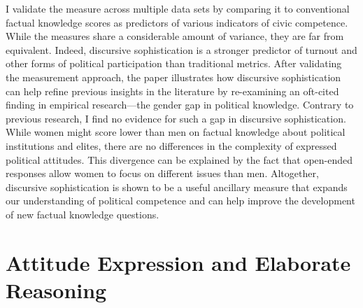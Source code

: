 I validate the measure across multiple data sets by comparing it to conventional factual knowledge scores as predictors of various indicators of civic competence. While the measures share a considerable amount of variance, they are far from equivalent. Indeed, discursive sophistication is a stronger predictor of turnout and other forms of political participation than traditional metrics. After validating the measurement approach, the paper illustrates how discursive sophistication can help refine previous insights in the literature by re-examining an oft-cited finding in empirical research---the gender gap in political knowledge. Contrary to previous research, I find no evidence for such a gap in discursive sophistication. While women might score lower than men on factual knowledge about political institutions and elites, there are no differences in the complexity of expressed political attitudes. This divergence can be explained by the fact that open-ended responses allow women to focus on different issues than men. Altogether, discursive sophistication is shown to be a useful ancillary measure that expands our understanding of political competence and can help improve the development of new factual knowledge questions.



\section*{Attitude Expression and Elaborate Reasoning}



